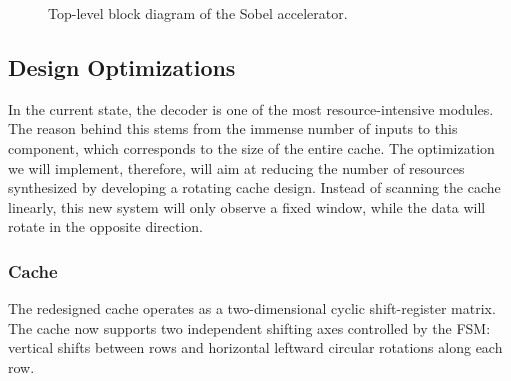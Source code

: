 \begin{figure}[H]
\caption{Top-level block diagram of the Sobel accelerator.}
\label{fig:sys_struct}
\end{figure}

\subsection{Design Optimizations}

In the current state, the decoder is one of the most resource-intensive modules. The reason behind this stems from the immense number of inputs to this component, which corresponds to the size of the entire cache. The optimization we will implement, therefore, will aim at reducing the number of resources synthesized by developing a rotating cache design. Instead of scanning the cache linearly, this new system will only observe a fixed window, while the data will rotate in the opposite direction.

\subsubsection{Cache}

 The redesigned cache operates as a two-dimensional cyclic shift-register matrix. The cache now supports two independent shifting axes controlled by the FSM: vertical shifts between rows and horizontal leftward circular rotations along each row.

